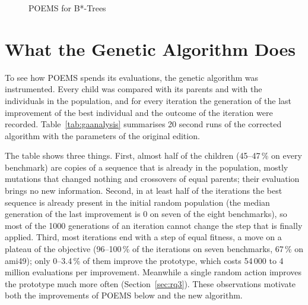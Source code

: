 \begin{figure}
\centering
\begin{algorithmic}[1]
    \ENDFOR
      \STATE{$\beta \leftarrow \sigma(\beta)$}
    \ENDIF
      \STATE{$\beta^* \leftarrow \beta$}
    \ENDIF
  \ENDWHILE
  \RETURN{$\beta^*$}
\end{algorithmic}
\caption{POEMS for B*-Trees}
\label{fig:poems}
\end{figure}

\section{What the Genetic Algorithm Does}
\label{sec:gaanalysis}

To see how POEMS spends its evaluations, the genetic algorithm was instrumented. Every child was compared with its parents and with the individuals in the population, and for every iteration the generation of the last improvement of the best individual and the outcome of the iteration were recorded. Table~\ref{tab:gaanalysis} summarises 20 second runs of the corrected algorithm with the parameters of the original edition.



The table shows three things. First, almost half of the children (45--47\,\% on every benchmark) are copies of a sequence that is already in the population, mostly mutations that changed nothing and crossovers of equal parents; their evaluation brings no new information. Second, in at least half of the iterations the best sequence is already present in the initial random population (the median generation of the last improvement is 0 on seven of the eight benchmarks), so most of the 1000 generations of an iteration cannot change the step that is finally applied. Third, most iterations end with a step of equal fitness, a move on a plateau of the objective (96--100\,\% of the iterations on seven benchmarks, 67\,\% on ami49); only 0--3.4\,\% of them improve the prototype, which costs 54\,000 to 4 million evaluations per improvement. Meanwhile a single random action improves the prototype much more often (Section~\ref{sec:rq3}). These observations motivate both the improvements of POEMS below and the new algorithm.

